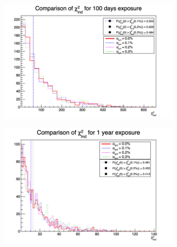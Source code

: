 \documentclass[../main.tex]{subfiles}
\begin{document}
\begin{figure}[th]
  \centering
  \begin{subfigure}[t]{0.48\linewidth}
    \includegraphics[width=\linewidth]{images/joint_fit/stat_tests/chi2_ind_100d.png}
  \end{subfigure}
  \begin{subfigure}[t]{0.48\linewidth}
    \includegraphics[width=\linewidth]{images/joint_fit/stat_tests/chi2_ind_1y.png}
  \end{subfigure}



\end{figure}
\end{document}
